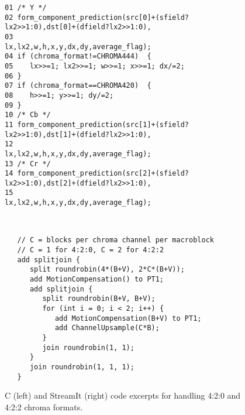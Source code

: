 \label{section:chroma}

\begin{figure*}[t]
  \vspace{-6pt}
 \begin{minipage}[t]{4.1in}{
  \begin{scriptsize}
   \begin{verbatim}
01 /* Y */
02 form_component_prediction(src[0]+(sfield?lx2>>1:0),dst[0]+(dfield?lx2>>1:0),
03                           lx,lx2,w,h,x,y,dx,dy,average_flag);
04 if (chroma_format!=CHROMA444)  {
05    lx>>=1; lx2>>=1; w>>=1; x>>=1; dx/=2;
06 }
07 if (chroma_format==CHROMA420)  {
08    h>>=1; y>>=1; dy/=2;
09 }
10 /* Cb */
11 form_component_prediction(src[1]+(sfield?lx2>>1:0),dst[1]+(dfield?lx2>>1:0),
12                           lx,lx2,w,h,x,y,dx,dy,average_flag);
13 /* Cr */
14 form_component_prediction(src[2]+(sfield?lx2>>1:0),dst[2]+(dfield?lx2>>1:0),
15                           lx,lx2,w,h,x,y,dx,dy,average_flag);    
   \end{verbatim}
  \end{scriptsize}
 }
 \label{fig:chroma-stream}
\vspace{-12pt}
 \end{minipage}
 ~\vrule
 \begin{minipage}[t]{4.3in}{
  \begin{scriptsize}
   \begin{verbatim}
   // C = blocks per chroma channel per macroblock 
   // C = 1 for 4:2:0, C = 2 for 4:2:2
   add splitjoin {
      split roundrobin(4*(B+V), 2*C*(B+V));
      add MotionCompensation() to PT1;
      add splitjoin {
         split roundrobin(B+V, B+V);
         for (int i = 0; i < 2; i++) {
            add MotionCompensation(B+V) to PT1;
            add ChannelUpsample(C*B);
         }
         join roundrobin(1, 1);
      }
      join roundrobin(1, 1, 1);
   }
   \end{verbatim}
  \end{scriptsize}
 }
 \vspace{-12pt}
 \end{minipage}
 \caption{C (left) and StreamIt (right) code excerpts for handling
          4:2:0 and 4:2:2 chroma formats.} %
 \label{fig:chroma-format-code}
 \vspace{-8pt}
\end{figure*}

